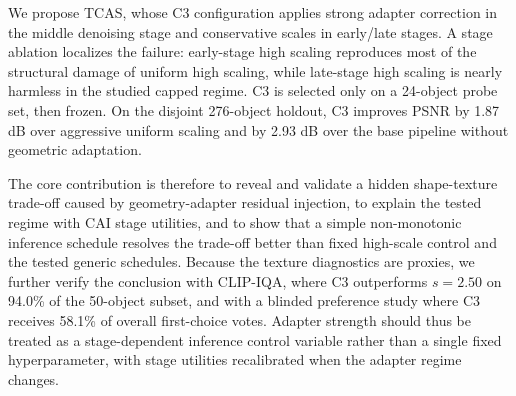 \documentclass[times,twocolumn,final]{elsarticle}
\begin{document}
We propose TCAS, whose C3 configuration applies strong adapter correction in the middle denoising stage and conservative scales in early/late stages. A stage ablation localizes the failure: early-stage high scaling reproduces most of the structural damage of uniform high scaling, while late-stage high scaling is nearly harmless in the studied capped regime. C3 is selected only on a 24-object probe set, then frozen. On the disjoint 276-object holdout, C3 improves PSNR by 1.87 dB over aggressive uniform scaling and by 2.93 dB over the base pipeline without geometric adaptation.

The core contribution is therefore to reveal and validate a hidden shape-texture trade-off caused by geometry-adapter residual injection, to explain the tested regime with CAI stage utilities, and to show that a simple non-monotonic inference schedule resolves the trade-off better than fixed high-scale control and the tested generic schedules. Because the texture diagnostics are proxies, we further verify the conclusion with CLIP-IQA, where C3 outperforms $s = 2.50$ on 94.0\% of the 50-object subset, and with a blinded preference study where C3 receives 58.1\% of overall first-choice votes. Adapter strength should thus be treated as a stage-dependent inference control variable rather than a single fixed hyperparameter, with stage utilities recalibrated when the adapter regime changes.
\end{document}
